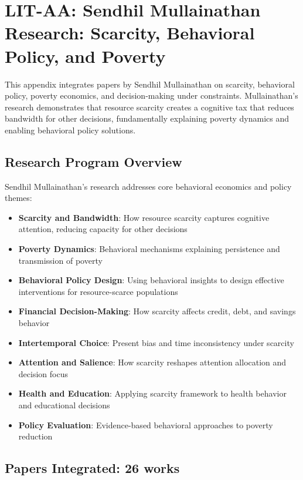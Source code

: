 
\section{LIT-AA: Sendhil Mullainathan Research: Scarcity, Behavioral Policy, and Poverty}
\label{app:litaa}

This appendix integrates papers by Sendhil Mullainathan on scarcity, behavioral policy, poverty economics, and decision-making under constraints. Mullainathan's research demonstrates that resource scarcity creates a cognitive tax that reduces bandwidth for other decisions, fundamentally explaining poverty dynamics and enabling behavioral policy solutions.

\subsection{Research Program Overview}

Sendhil Mullainathan's research addresses core behavioral economics and policy themes:

\begin{itemize}
  \item \textbf{Scarcity and Bandwidth}: How resource scarcity captures cognitive attention, reducing capacity for other decisions
  \item \textbf{Poverty Dynamics}: Behavioral mechanisms explaining persistence and transmission of poverty
  \item \textbf{Behavioral Policy Design}: Using behavioral insights to design effective interventions for resource-scarce populations
  \item \textbf{Financial Decision-Making}: How scarcity affects credit, debt, and savings behavior
  \item \textbf{Intertemporal Choice}: Present bias and time inconsistency under scarcity
  \item \textbf{Attention and Salience}: How scarcity reshapes attention allocation and decision focus
  \item \textbf{Health and Education}: Applying scarcity framework to health behavior and educational decisions
  \item \textbf{Policy Evaluation}: Evidence-based behavioral approaches to poverty reduction
\end{itemize}

\subsection{Papers Integrated: 26 works}


